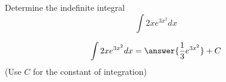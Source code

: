 \documentclass{ximera}
\author{Jason Miller}
\begin{document}
\begin{exercise}
Determine the indefinite integral
\[
\int 2xe^{3x^{2}} dx 
\]



\[
\int 2xe^{3x^{2}} dx=\answer{\frac{1}{3}e^{3x^{2}}}+C
\]
(Use $C$ for the constant of integration)

\end{exercise}
\end{document}
